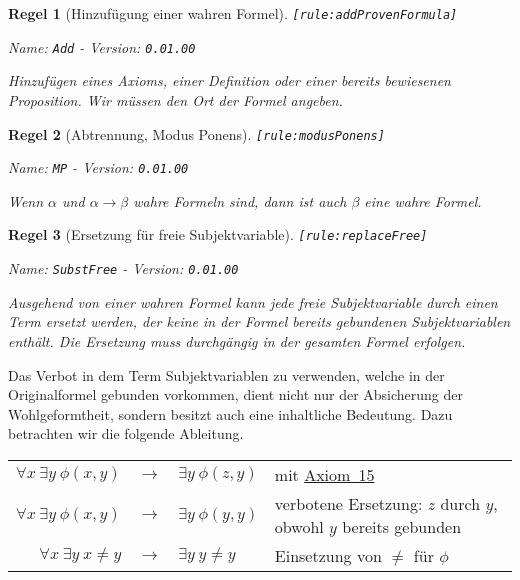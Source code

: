 \documentclass[a4paper,german,10pt,twoside]{book}
\newtheorem{rul}{Regel}
\theoremstyle{definition}
\theoremstyle{remark}
\begin{document}
\begin{rul}[Hinzuf{\"u}gung einer wahren Formel]
\label{rule:addProvenFormula} \hypertarget{rule:addProvenFormula}{}
{\tt \tiny [\verb]rule:addProvenFormula]]}

\par
{\em   Name: \verb]Add]  -  Version: \verb]0.01.00]}


Hinzuf{\"u}gen eines Axioms, einer Definition oder einer bereits bewiesenen Proposition. Wir m{\"u}ssen den Ort der Formel angeben.
\end{rul}


\begin{rul}[Abtrennung, Modus Ponens]
\label{rule:modusPonens} \hypertarget{rule:modusPonens}{}
{\tt \tiny [\verb]rule:modusPonens]]}

\par
{\em   Name: \verb]MP]  -  Version: \verb]0.01.00]}


Wenn $\alpha$ und $\alpha \rightarrow \beta$ wahre Formeln sind, dann ist auch $\beta$ eine wahre Formel.
\end{rul}


\begin{rul}[Ersetzung f{\"u}r freie Subjektvariable]
\label{rule:replaceFree} \hypertarget{rule:replaceFree}{}
{\tt \tiny [\verb]rule:replaceFree]]}

\par
{\em   Name: \verb]SubstFree]  -  Version: \verb]0.01.00]}


Ausgehend von einer wahren Formel kann jede freie Subjektvariable durch einen Term ersetzt werden, der keine in der Formel bereits gebundenen Subjektvariablen enth{\"a}lt. Die Ersetzung muss durchg{\"a}ngig in der gesamten Formel erfolgen.
\end{rul}

Das Verbot in dem Term Subjektvariablen zu verwenden, welche in der Originalformel gebunden vorkommen, dient nicht nur der Absicherung der Wohlgeformtheit, sondern besitzt auch eine inhaltliche Bedeutung. Dazu betrachten wir die folgende Ableitung.

\par
\begin{tabularx}{\linewidth}{rclX}
  $\forall x \ \exists y \ \phi(x, y)$ & $\rightarrow$ & $\exists y \ \phi(z,y)$ 
    & mit \hyperlink{axiom:universalInstantiation}{Axiom~15} \\
  $\forall x \ \exists y \ \phi(x, y)$ & $\rightarrow$ & $\exists y \ \phi(y,y)$ 
    & verbotene Ersetzung: $z$ durch $y$, obwohl $y$ bereits gebunden \\
  $\forall x \ \exists y \ x \neq y$ & $\rightarrow$ & $\exists y \ y \neq y$ 
    &  Einsetzung von $\neq$ f{\"u}r $\phi$
\end{tabularx}
\end{document}
